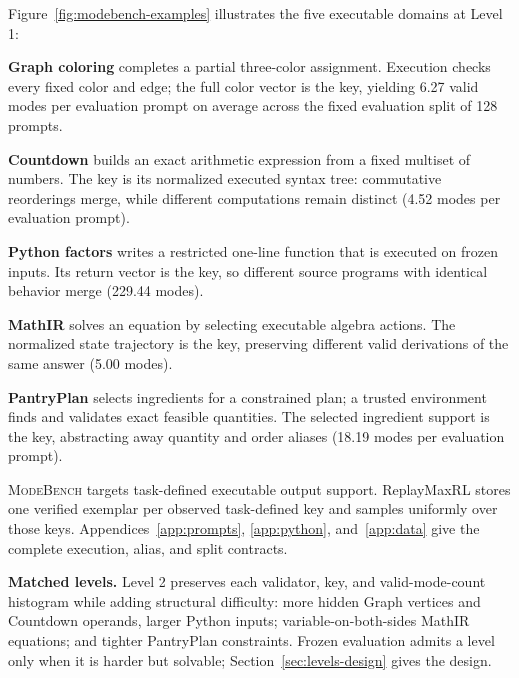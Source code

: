 \documentclass{article}
\newcommand{\1}{\mathbf 1}
\newcommand{\mb}{\textsc{ModeBench}}
\newcommand{\domlabel}[2]{\colorbox{#1}{\textbf{#2}}}
\theoremstyle{remark}
\theoremstyle{definition}
\theoremstyle{plain}
\begin{document}
Figure~\ref{fig:modebench-examples} illustrates the five executable domains at
Level 1:

\begin{list}{\textbullet}{%
  \setlength{\leftmargin}{1.35em}%
  \setlength{\labelwidth}{0.70em}%
  \setlength{\labelsep}{0.35em}%
  \setlength{\itemindent}{0pt}%
  \setlength{\listparindent}{0pt}%
  \setlength{\parsep}{0pt}%
  \setlength{\topsep}{0.3em}%
  \setlength{\itemsep}{0.25em}}
  \item \domlabel{domGraph}{Graph coloring} completes a partial three-color
  assignment. Execution checks every fixed color and edge; the full color
  vector is the key, yielding 6.27 valid modes per evaluation prompt on
  average across the fixed evaluation split of 128 prompts.

  \item \domlabel{domCountdown}{Countdown} builds an exact arithmetic
  expression from a fixed multiset of numbers. The key is its normalized
  executed syntax tree: commutative reorderings merge, while different
  computations remain distinct (4.52 modes per evaluation prompt).

  \item \domlabel{domPython}{Python factors} writes a restricted one-line
  function that is executed on frozen inputs. Its return vector is the key,
  so different source programs with identical behavior merge (229.44 modes).

  \item \domlabel{domMathIR}{MathIR} solves an equation by selecting
  executable algebra actions. The normalized state trajectory is the key,
  preserving different valid derivations of the same answer (5.00 modes).

  \item \domlabel{domPantry}{PantryPlan} selects ingredients for a constrained
  plan; a trusted environment finds and validates exact feasible quantities.
  The selected ingredient support is the key, abstracting away quantity and
  order aliases (18.19 modes per evaluation prompt).
\end{list}

\mb{} targets task-defined executable output support. ReplayMaxRL stores
one verified exemplar per observed task-defined key and samples uniformly over
those keys.
Appendices~\ref{app:prompts}, \ref{app:python}, and~\ref{app:data} give the
complete execution, alias, and split contracts.

\noindent\textbf{Matched levels.}
Level 2 preserves each validator, key, and valid-mode-count histogram while
adding structural difficulty: more hidden Graph vertices and Countdown operands, larger
Python inputs; variable-on-both-sides MathIR equations; and tighter PantryPlan
constraints. Frozen evaluation admits a level only when it is harder but
solvable; Section~\ref{sec:levels-design} gives the design.
\end{document}
